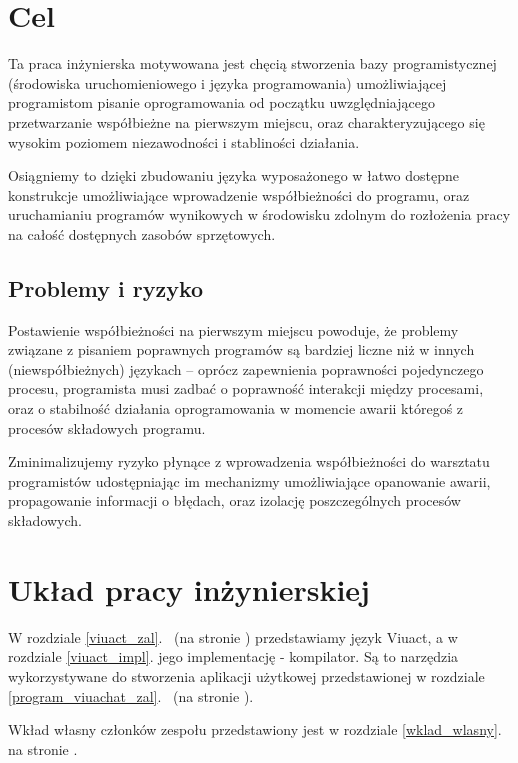 \section{Cel}

Ta praca inżynierska motywowana jest chęcią stworzenia bazy programistycznej (środowiska uruchomieniowego i
języka programowania) umożliwiającej programistom pisanie oprogramowania od początku uwzględniającego
przetwarzanie współbieżne na pierwszym miejscu, oraz charakteryzującego się wysokim poziomem niezawodności i
stabliności działania.

Osiągniemy to dzięki zbudowaniu języka wyposażonego w łatwo dostępne konstrukcje umożliwiające wprowadzenie
współbieżności do programu, oraz uruchamianiu programów wynikowych w środowisku zdolnym do rozłożenia pracy na
całość dostępnych zasobów sprzętowych.

\subsection{Problemy i ryzyko}

Postawienie współbieżności na pierwszym miejscu powoduje, że problemy związane z pisaniem poprawnych programów
są bardziej liczne niż w innych (niewspółbieżnych) językach -- oprócz zapewnienia poprawności pojedynczego
procesu, programista musi zadbać o poprawność interakcji między procesami, oraz o stabilność działania
oprogramowania w momencie awarii któregoś z procesów składowych programu.

Zminimalizujemy ryzyko płynące z wprowadzenia współbieżności do warsztatu programistów udostępniając im
mechanizmy umożliwiające opanowanie awarii, propagowanie informacji o błędach, oraz izolację poszczególnych
procesów składowych.

\section{Układ pracy inżynierskiej}

W rozdziale \ref{viuact_zal}.~ (na stronie \pageref{viuact_zal}) przedstawiamy język
Viuact, a w rozdziale \ref{viuact_impl}. jego implementację - kompilator. Są to narzędzia wykorzystywane do
stworzenia aplikacji użytkowej przedstawionej w rozdziale
\ref{program_viuachat_zal}.~ (na stronie \pageref{program_viuachat_zal}).

Wkład własny członków zespołu przedstawiony jest w rozdziale \ref{wklad_wlasny}. na stronie
\pageref{wklad_wlasny}.


